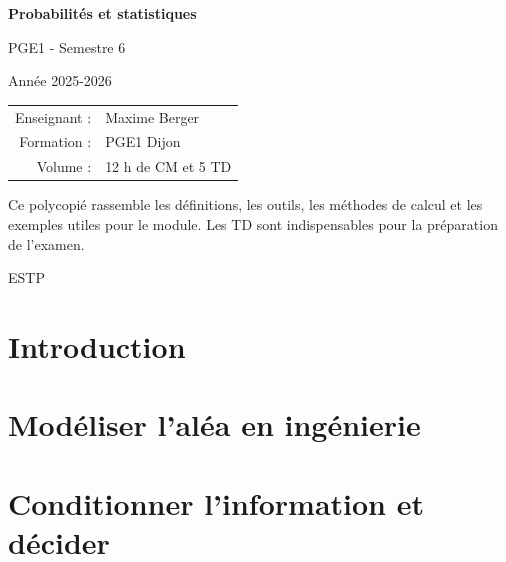 %

\newcommand{\Var}{\operatorname{Var}}



\begin{titlepage}
\thispagestyle{empty}
\begin{center}
\vspace*{2cm}
{\Huge\bfseries Probabilités et statistiques\par}
\vspace{0.5cm}
{\Large PGE1 - Semestre 6\par}
\vspace{0.8cm}
{\Large Année 2025-2026\par}
\vspace{1.5cm}
\vspace{0.5cm}
\vspace{2cm}
\begin{tabular}{rl}
Enseignant : & Maxime Berger \\
Formation : & PGE1 Dijon \\
Volume : & 12 h de CM et 5 TD \\
\end{tabular}
\vfill
\begin{minipage}{0.85\textwidth}
\centering
Ce polycopié rassemble les définitions, les outils, les méthodes de calcul et les exemples utiles pour le module. 
Les TD sont indispensables pour la préparation de l'examen.
\end{minipage}
\vfill
{\large ESTP\par}
\end{center}
\end{titlepage}

\tableofcontents

\newpage
{}

\chapter{Introduction}


\chapter{Modéliser l'aléa en ingénierie}


\chapter{Conditionner l'information et décider}


